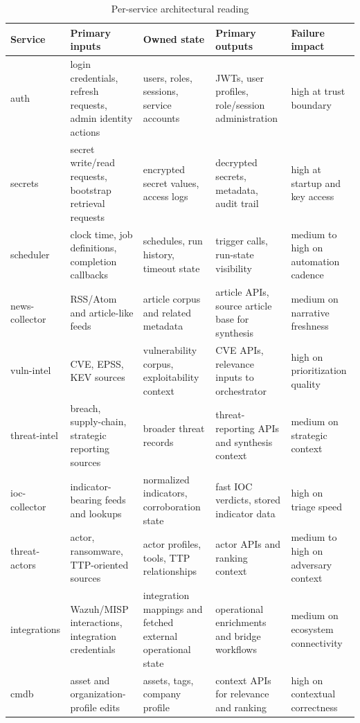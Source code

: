 \begin{table}[H]
\centering
\caption{Per-service architectural reading}
\label{tab:service-architecture-matrix}
\renewcommand{\arraystretch}{1.18}
\begin{tabular}{|p{2.4cm}|p{3.0cm}|p{3.0cm}|p{2.9cm}|p{2.1cm}|}
\hline
\textbf{Service} & \textbf{Primary inputs} & \textbf{Owned state} & \textbf{Primary outputs} & \textbf{Failure impact}\\
\hline
auth & login credentials, refresh requests, admin identity actions & users, roles, sessions, service accounts & JWTs, user profiles, role/session administration & high at trust boundary\\
\hline
secrets & secret write/read requests, bootstrap retrieval requests & encrypted secret values, access logs & decrypted secrets, metadata, audit trail & high at startup and key access\\
\hline
scheduler & clock time, job definitions, completion callbacks & schedules, run history, timeout state & trigger calls, run-state visibility & medium to high on automation cadence\\
\hline
news-collector & RSS/Atom and article-like feeds & article corpus and related metadata & article APIs, source article base for synthesis & medium on narrative freshness\\
\hline
vuln-intel & CVE, EPSS, KEV sources & vulnerability corpus, exploitability context & CVE APIs, relevance inputs to orchestrator & high on prioritization quality\\
\hline
threat-intel & breach, supply-chain, strategic reporting sources & broader threat records & threat-reporting APIs and synthesis context & medium on strategic context\\
\hline
ioc-collector & indicator-bearing feeds and lookups & normalized indicators, corroboration state & fast IOC verdicts, stored indicator data & high on triage speed\\
\hline
threat-actors & actor, ransomware, TTP-oriented sources & actor profiles, tools, TTP relationships & actor APIs and ranking context & medium to high on adversary context\\
\hline
integrations & Wazuh/MISP interactions, integration credentials & integration mappings and fetched external operational state & operational enrichments and bridge workflows & medium on ecosystem connectivity\\
\hline
cmdb & asset and organization-profile edits & assets, tags, company profile & context APIs for relevance and ranking & high on contextual correctness\\

\end{tabular}
\end{table}
